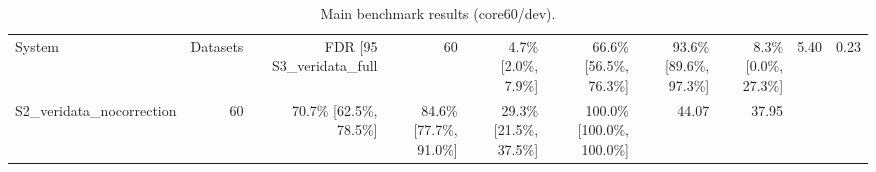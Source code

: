 \begin{table}[htbp]
\centering
\caption{Main benchmark results (core60/dev).}
\label{tab:table_e1_main}
\begin{tabular}{lrrrrrrr}
\toprule
System & Datasets & FDR [95%
\midrule
S3\_veridata\_full & 60 & 4.7\% [2.0\%, 7.9\%] & 66.6\% [56.5\%, 76.3\%] & 93.6\% [89.6\%, 97.3\%] & 8.3\% [0.0\%, 27.3\%] & 5.40 & 0.23 \\
S2\_veridata\_nocorrection & 60 & 70.7\% [62.5\%, 78.5\%] & 84.6\% [77.7\%, 91.0\%] & 29.3\% [21.5\%, 37.5\%] & 100.0\% [100.0\%, 100.0\%] & 44.07 & 37.95 \\
\bottomrule
\end{tabular}
\end{table}
